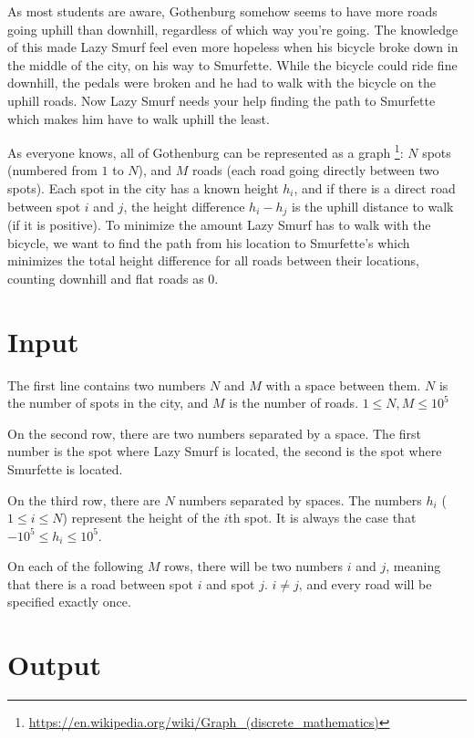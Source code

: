 
As most students are aware, Gothenburg somehow seems to have more roads going uphill than downhill,
regardless of which way you're going. The knowledge of this made Lazy Smurf feel even more hopeless
when his bicycle broke down in the middle of the city, on his way to Smurfette. While the bicycle could ride
fine downhill, the pedals were broken and he had to walk with the bicycle on the uphill roads. Now Lazy Smurf needs
your help finding the path to Smurfette which makes him have to walk
uphill the least.

As everyone knows, all of Gothenburg can be represented as a graph
\footnote{\url{https://en.wikipedia.org/wiki/Graph_(discrete_mathematics)}}:
$N$ spots (numbered from $1$ to $N$), and $M$ roads
(each road going directly between two spots). Each spot in the city has a known
height $h_i$, and if there is a direct road between spot $i$ and $j$, the height difference $h_i-h_j$
is the uphill distance to walk (if it is positive). To minimize the amount Lazy Smurf has to walk
with the bicycle, we want to find the path from his location to Smurfette's which minimizes the total
height difference for all roads between their locations, counting downhill and flat roads as $0$.

\section*{Input}
The first line contains two numbers $N$ and $M$ with a space between them. $N$
is the number of spots in the city, and $M$ is the number of roads. $1 \le N, M \le 10^5$

On the second row, there are two numbers separated by a space. The first number is the spot where
Lazy Smurf is located, the second is the spot where Smurfette is located.

On the third row, there are $N$ numbers separated by spaces. The numbers $h_i$ ($1 \le i \le N$)
represent the height of the $i$th spot. It is always the case that $ -10^5 \le h_i \le 10^5 $.

On each of the following $M$ rows, there will be two numbers $i$ and $j$, meaning that there is a
road between spot $i$ and spot $j$. $i \ne j$, and every road will be specified exactly once.

\section*{Output}

